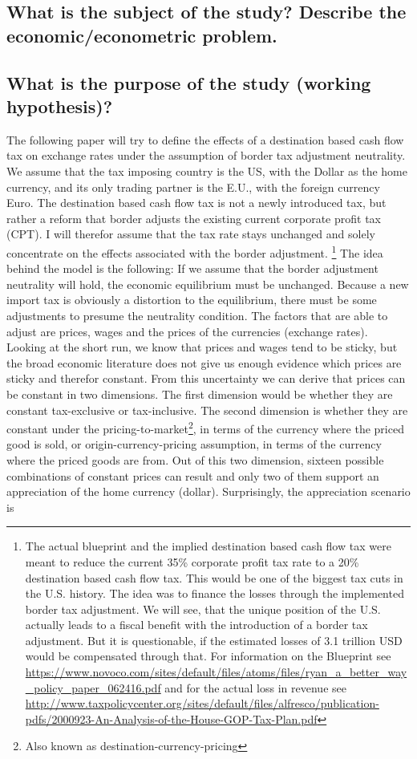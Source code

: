 \subsection{What is the subject of the study? Describe the economic/econometric problem.}




\subsection{What is the purpose of the study (working hypothesis)?}
The following paper will try to define the effects of a destination based cash flow tax on exchange rates under the assumption of border tax adjustment neutrality. We assume that the tax imposing country is the US, with the Dollar as the home currency, and its only trading partner is the E.U., with the foreign currency Euro. The destination based cash flow tax is not a newly introduced tax, but rather a reform that border adjusts the existing current corporate profit tax (CPT). I will therefor assume that the tax rate stays unchanged and solely concentrate on the effects associated with the border adjustment. \footnote{The actual blueprint and the implied destination based cash flow tax were meant to reduce the current 35\% corporate profit tax rate to a 20\% destination based cash flow tax. This would be one of the biggest tax cuts in the U.S. history. The idea was to finance the losses through the implemented border tax adjustment. We will see, that the unique position of the U.S. actually leads to a fiscal benefit with the introduction of a border tax adjustment. But it is questionable, if the estimated losses of 3.1 trillion USD would be compensated through that. For information on the Blueprint see \url{https://www.novoco.com/sites/default/files/atoms/files/ryan_a_better_way_policy_paper_062416.pdf} and for the actual loss in revenue see \url{http://www.taxpolicycenter.org/sites/default/files/alfresco/publication-pdfs/2000923-An-Analysis-of-the-House-GOP-Tax-Plan.pdf}} The idea behind the model is the following: If we assume that the border adjustment neutrality will hold, the economic equilibrium must be unchanged. Because a new import tax is obviously a distortion to the equilibrium, there must be some adjustments to presume the neutrality condition. The factors that are able to adjust are prices, wages and the prices of the currencies (exchange rates). Looking at the short run, we know that prices and wages tend to be sticky, but the broad economic literature does not give us enough evidence which prices are sticky and therefor constant. From this uncertainty we can derive that prices can be constant in two dimensions. The first dimension would be whether they are constant tax-exclusive or tax-inclusive. The second dimension is whether they are constant under the pricing-to-market\footnote{Also known as destination-currency-pricing}, in terms of the currency where the priced good is sold, or origin-currency-pricing assumption, in terms of the currency where the priced goods are from. Out of this two dimension, sixteen possible combinations of constant prices can result and only two of them support an appreciation of the home currency (dollar). Surprisingly, the appreciation scenario is 